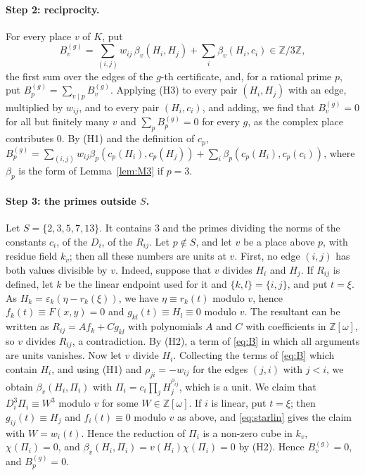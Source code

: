 \documentclass[11pt]{article}
\newcommand{\Z}{\mathbb{Z}}
\begin{document}
\paragraph{Step 2: reciprocity.} For every place $v$ of $K$, put
\begin{equation}\label{eq:B}
B^{(g)}_v=\sum_{(i,j)}w_{ij}\,\beta_v(H_i,H_j)+\sum_i\beta_v(H_i,c_i)\in\Z/3\Z,
\end{equation}
the first sum over the edges of the $g$-th certificate, and, for a rational prime $p$, put $B^{(g)}_p=\sum_{v\mid p}B^{(g)}_v$. Applying (H3) to every pair $(H_i,H_j)$ with an edge, multiplied by $w_{ij}$, and to every pair $(H_i,c_i)$, and adding, we find that $B^{(g)}_v=0$ for all but finitely many $v$ and $\sum_pB^{(g)}_p=0$ for every $g$, as the complex place contributes $0$. By (H1) and the definition of $c_p$, $B^{(g)}_p=\sum_{(i,j)}w_{ij}\beta_p(c_p(H_i),c_p(H_j))+\sum_i\beta_p(c_p(H_i),c_p(c_i))$, where $\beta_p$ is the form of Lemma~\ref{lem:M3} if $p=3$.

\paragraph{Step 3: the primes outside $S$.} Let $S=\{2,3,5,7,13\}$. It contains $3$ and the primes dividing the norms of the constants $c_i$, of the $D_i$, of the $R_{ij}$. Let $p\notin S$, and let $v$ be a place above $p$, with residue field $k_v$; then all these numbers are units at $v$. First, no edge $(i,j)$ has both values divisible by $v$. Indeed, suppose that $v$ divides $H_i$ and $H_j$. If $R_{ij}$ is defined, let $k$ be the linear endpoint used for it and $\{k,l\}=\{i,j\}$, and put $t=\xi$. As $H_k=\varepsilon_k(\eta-r_k(\xi))$, we have $\eta\equiv r_k(t)$ modulo $v$, hence $f_k(t)\equiv F(x,y)=0$ and $g_{kl}(t)\equiv H_l\equiv0$ modulo $v$. The resultant can be written as $R_{ij}=Af_k+Cg_{kl}$ with polynomials $A$ and $C$ with coefficients in $\Z[\omega]$, so $v$ divides $R_{ij}$, a contradiction. By (H2), a term of \eqref{eq:B} in which all arguments are units vanishes. Now let $v$ divide $H_i$. Collecting the terms of \eqref{eq:B} which contain $H_i$, and using (H1) and $\rho_{ji}=-w_{ij}$ for the edges $(j,i)$ with $j<i$, we obtain $\beta_v(H_i,\Pi_i)$ with $\Pi_i=c_i\prod_jH_j^{\rho_{ij}}$, which is a unit. We claim that $D_i^3\Pi_i\equiv W^3$ modulo $v$ for some $W\in\Z[\omega]$. If $i$ is linear, put $t=\xi$; then $g_{ij}(t)\equiv H_j$ and $f_i(t)\equiv0$ modulo $v$ as above, and \eqref{eq:starlin} gives the claim with $W=w_i(t)$. Hence the reduction of $\Pi_i$ is a non-zero cube in $k_v$, $\chi(\Pi_i)=0$, and $\beta_v(H_i,\Pi_i)=v(H_i)\chi(\Pi_i)=0$ by (H2). Hence $B^{(g)}_v=0$, and $B^{(g)}_p=0$.
\end{document}
